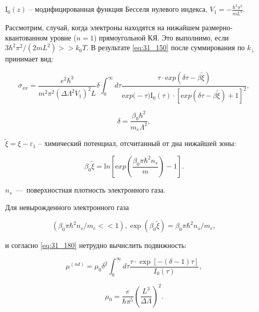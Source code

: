 \noindent ${\mathrm I}_{0} (z)$ -- модифицированная функция Бесселя нулевого индекса, $V_{1} =-\frac{\hbar ^{2} \pi ^{2} }{mL^{3} } $.

Рассмотрим, случай, когда электроны находятся на нижайшем размерно-квантованном уровне ($n=1$) прямоугольной КЯ. Это выполнимо, если $3\hbar ^{2} \pi ^{2} /\left(2mL^{2} \right)>>k_{0} T$. В результате \eqref{eq:31_150} после суммирования по $k_{\bot } $ принимает вид:

\begin{equation} \label{eq:31_180}
\sigma _{xx} =\frac{e^{2} \hbar ^{3} }{m^{2} \pi ^{2} \left(\Delta \Lambda ^{2} V_{1} \right)^{2} L} \delta \int _{0}^{\infty }d\tau \frac{\tau \cdot {\mathrm exp}\left(\delta \tau -\beta \tilde{\xi }\right)}{{\mathrm exp(}-\tau ){\mathrm I}_{{\mathrm 0}} (\tau )\cdot \left[{\mathrm exp}\left(\delta \tau -\beta \tilde{\xi }\right)+1\right]^{2} },
\end{equation}

\[
\delta =\frac{\beta _{0} \hbar ^{2} }{m_{e} \Lambda ^{2} },
\] 

$\tilde{\xi }=\xi -\varepsilon _{1} $ -- химический потенциал, отсчитанный от дна нижайшей зоны:

\begin{equation} \label{eq:31_190}
\beta _{0} \tilde{\xi }={\mathrm ln}\left[{\mathrm exp}\left(\frac{\beta _{0} \pi \hbar ^{2} n_{s} }{m} \right)-1\right].
\end{equation}

\noindent  $n_{s} $~---~поверхностная плотность электронного газа.

Для невырожденного электронного газа

$$\left(\beta _{0} \pi \hbar ^{2} n_{s} /m_{e} <<1\right), {\exp}\left(\beta _{0} \tilde{\xi }\right)=\beta _{0} \pi \hbar ^{2} n_{s} /m_{e}, $$

\noindent и согласно \eqref{eq:31_180} нетрудно вычислить подвижность:

\begin{equation} \label{eq:31_200}
\mu ^{(nd)} =\mu _{0} \delta ^{2} \int _{0}^{\infty }d\tau \frac{\tau \cdot \exp \left[-\left(\delta -1\right)\tau \right]}{I_{0} (\tau )},
\end{equation}

\[
\mu _{0} =\frac{e}{\hbar \pi ^{5} } \left(\frac{L^{3} }{\Delta \Lambda } \right)^{2}.
\] 

